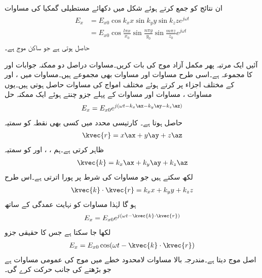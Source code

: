 ان نتائج کو جمع کرتے ہوئے  شکل  میں دکھائے مستطیلی گمکیا کی مساوات
\begin{gather}
\begin{aligned}
E_x&=E_{x0} \cos k_x x \sin k_y y \sin k_z z e^{j \omega t}\\
&=E_{x0} \cos \frac{l \pi x }{x_0} \sin \frac{n \pi y}{y_0} \sin \frac{m \pi z}{z_0} e^{j \omega t}
\end{aligned}
\end{gather}
حاصل ہوتی ہے جو ساکن موج ہے۔


آئیں ایک مرتبہ پھر مکمل آزاد موج کی بات کریں۔مساوات  دراصل دو ممکنہ جوابات  اور  کا مجموعہ ہے۔اسی طرح مساوات   اور مساوات  بھی مجموعے ہیں۔مساوات  میں ،  اور  کے مختلف اجزاء پر کرتے ہوئے مختلف امواج کی مساوات حاصل ہوتی ہیں۔یوں مساوات ، مساوات   اور مساوات  کے پہلے جزو چنتے ہوئے ایک ممکنہ حل
\begin{align}\label{مساوات_مویج_گمکی_عمومی_ث}
E_x=E_{x0} e^{j (\omega t -k_x \ax -k_y \ay-k_z \az)}
\end{align}
حاصل ہوتا ہے۔ کارتیسی محدد میں کسی بھی نقطہ  کو سمتیہ
\begin{align}\label{مساوات_مویج_گمکی_عمومی_ج}
\kvec{r}=x\ax+y\ay+z\az
\end{align}
ظاہر کرتی ہے۔ہم ، ،   اور  کو سمتیہ
\begin{align}\label{مساوات_مویج_گمکی_عمومی_چ}
\kvec{k}=k_x \ax+k_y \ay +k_z \az
\end{align}
لکھ سکتے ہیں جو مساوات  کی شرط پر پورا اترتی ہے۔اس طرح 
\begin{align}\label{مساوات_مویج_گمکی_عمومی_ح}
\kvec{k} \cdot \kvec{r}=k_x x +k_y y +k_z z
\end{align}
ہو گا لہٰذا مساوات  کو نہایت عمدگی کے ساتھ
\begin{align}\label{مساوات_مویج_گمکی_عمومی_خ}
E_x=E_{x0} e^{j(\omega t-\kvec{k} \cdot \kvec{r})}
\end{align}
لکھا جا سکتا ہے جس کا حقیقی جزو
\begin{align}\label{مساوات_مویج_گمکی_عمومی_د}
E_x=E_{x0} \cos (\omega t -\kvec{k} \cdot \kvec{r})
\end{align}
اصل موج دیتا ہے۔مندرجہ بالا مساوات لامحدود خطے میں موج کی عمومی مساوات ہے جو بڑھتے  کی جانب حرکت کرے گی۔

